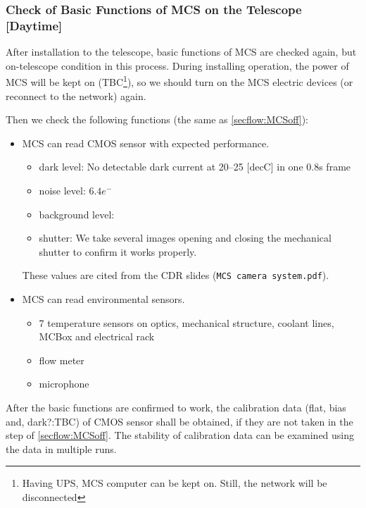 \subsubsection{Check of Basic Functions of MCS on the Telescope [Daytime]}\label{secflow:MCSon}


After installation to the telescope, basic functions of MCS are checked again, but on-telescope condition in this process.
During installing operation, the power of MCS will be kept on (TBC\footnote{Having UPS, MCS computer can be kept on. Still, the network will be disconnected}), so we should turn on the MCS electric devices (or reconnect to the network) again.

Then we check the following functions (the same as \ref{secflow:MCSoff}):

\begin{itemize}
\item MCS can read CMOS sensor with expected performance.
	\begin{itemize}
	\item dark level: No detectable dark current at 20--25 [decC] in one 0.8s frame
	\item noise level: $6.4 e^-$
	\item background level: 
	\item shutter: We take several images opening and closing the mechanical shutter to confirm it works properly.
	\end{itemize}
These values are cited from the CDR slides ({\tt MCS camera system.pdf}).
\item MCS can read environmental sensors.
	\begin{itemize}
	\item 7 temperature sensors on optics, mechanical structure, coolant lines, MCBox and electrical rack 
	\item flow meter
	\item microphone
	\end{itemize}
\end{itemize}

After the basic functions are confirmed to work, the calibration data (flat, bias and, dark?:TBC) of CMOS sensor shall be obtained, if they are not taken in the step of \ref{secflow:MCSoff}.
The stability of calibration data can be examined using the data in multiple runs.

